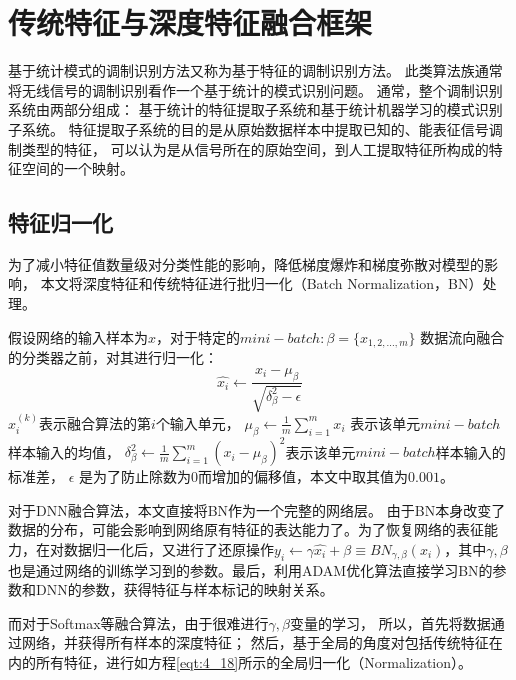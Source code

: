 \section{传统特征与深度特征融合框架}

基于统计模式的调制识别方法又称为基于特征的调制识别方法。
此类算法族通常将无线信号的调制识别看作一个基于统计的模式识别问题。
通常，整个调制识别系统由两部分组成：
基于统计的特征提取子系统和基于统计机器学习的模式识别子系统。
特征提取子系统的目的是从原始数据样本中提取已知的、能表征信号调制类型的特征，
可以认为是从信号所在的原始空间，到人工提取特征所构成的特征空间的一个映射。\par

\subsection{特征归一化}
\label{sec:feature_normalization}
为了减小特征值数量级对分类性能的影响，降低梯度爆炸和梯度弥散对模型的影响，
本文将深度特征和传统特征进行批归一化（Batch Normalization，BN）处理。\par

假设网络的输入样本为$x$，对于特定的$mini-batch: \beta=\{x_{1,2,...,m}\}$
数据流向融合的分类器之前，对其进行归一化：
\begin{equation}
	\label{eqt:4_18}
	\hat{x_i} \leftarrow \frac{x_i - \mu_\beta}{\sqrt{\delta_\beta^2 - \epsilon}}
\end{equation}
$x_i^{(k)}$表示融合算法的第$i$个输入单元，
$\mu_\beta \leftarrow \frac{1}{m}\sum_{i=1}^{m} x_i$ 表示该单元$mini-batch$样本输入的均值，
$	\delta_\beta^2 \leftarrow \frac{1}{m}\sum_{i=1}^{m}(x_i - \mu_\beta)^2$表示该单元$mini-batch$样本输入的标准差，
$\epsilon$ 是为了防止除数为$0$而增加的偏移值，本文中取其值为$0.001$。\par

对于DNN融合算法，本文直接将BN作为一个完整的网络层。
由于BN本身改变了数据的分布，可能会影响到网络原有特征的表达能力了。为了恢复网络的表征能力，在对数据归一化后，又进行了还原操作$y_i \leftarrow \gamma \hat{x_i} + \beta \equiv BN_{\gamma, \beta}(x_i)$，其中$\gamma, \beta$也是通过网络的训练学习到的参数。最后，利用ADAM优化算法直接学习BN的参数和DNN的参数，获得特征与样本标记的映射关系。\par

而对于Softmax等融合算法，由于很难进行$\gamma, \beta$变量的学习，
所以，首先将数据通过网络，并获得所有样本的深度特征；
然后，基于全局的角度对包括传统特征在内的所有特征，进行如方程\eqref{eqt:4_18}所示的全局归一化（Normalization）。\par

